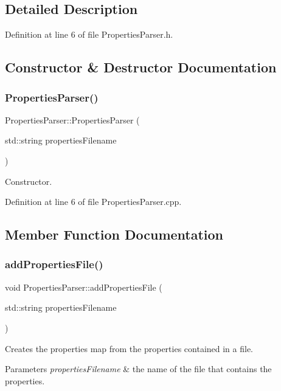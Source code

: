 \subsection{Detailed Description}


Definition at line 6 of file Properties\+Parser.\+h.



\subsection{Constructor \& Destructor Documentation}
\mbox{\label{class_properties_parser_aa075e76c89abc9639b2b146433ac9dd0}} 
\subsubsection{Properties\+Parser()}
{\footnotesize\ttfamily Properties\+Parser\+::\+Properties\+Parser (\begin{DoxyParamCaption}\item[{std\+::string}]{properties\+Filename }\end{DoxyParamCaption})}

Constructor. 

Definition at line 6 of file Properties\+Parser.\+cpp.



\subsection{Member Function Documentation}
\mbox{\label{class_properties_parser_a8cb6ad9a2c83e27dffc9a3a1f0cc6097}} 
\subsubsection{add\+Properties\+File()}
{\footnotesize\ttfamily void Properties\+Parser\+::add\+Properties\+File (\begin{DoxyParamCaption}\item[{std\+::string}]{properties\+Filename }\end{DoxyParamCaption})}

Creates the properties map from the properties contained in a file. 
\begin{DoxyParams}{Parameters}
{\em properties\+Filename} & the name of the file that contains the properties. \\
\hline
\end{DoxyParams}


